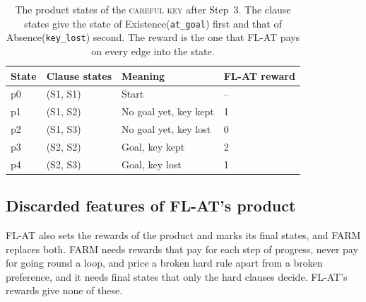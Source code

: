 \documentclass[11pt,english,listoffigures,listoftables]{tfgetsinf}
\newcommand{\runex}[1]{\textsc{#1}}  %
\begin{document}
\begin{table}[H]
\centering
\footnotesize
\renewcommand{\arraystretch}{1.2}
\begin{tabular}{@{}llll@{}}
\toprule
\textbf{State} & \textbf{Clause states} & \textbf{Meaning} & \textbf{FL-AT reward} \\ \midrule
p0 & (S1, S1) & Start & -- \\
p1 & (S1, S2) & No goal yet, key kept & 1 \\
p2 & (S1, S3) & No goal yet, key lost & 0 \\
p3 & (S2, S2) & Goal, key kept & 2 \\
p4 & (S2, S3) & Goal, key lost & 1 \\ \bottomrule
\end{tabular}
\caption[Product states of the \runex{careful key}]{The product states of the \runex{careful key} after Step~3. The clause states give the state of Existence(\texttt{at\_goal}) first and that of Absence(\texttt{key\_lost}) second. The reward is the one that FL-AT pays on every edge into the state.}
\label{tab:run-product}
\end{table}

\subsection{Discarded features of FL-AT's product}
\label{sec:flat-discard}
FL-AT also sets the rewards of the product and marks its final states, and FARM replaces both. FARM needs rewards that pay for each step of progress, never pay for going round a loop, and price a broken hard rule apart from a broken preference, and it needs final states that only the hard clauses decide. FL-AT's rewards give none of these.
\end{document}
